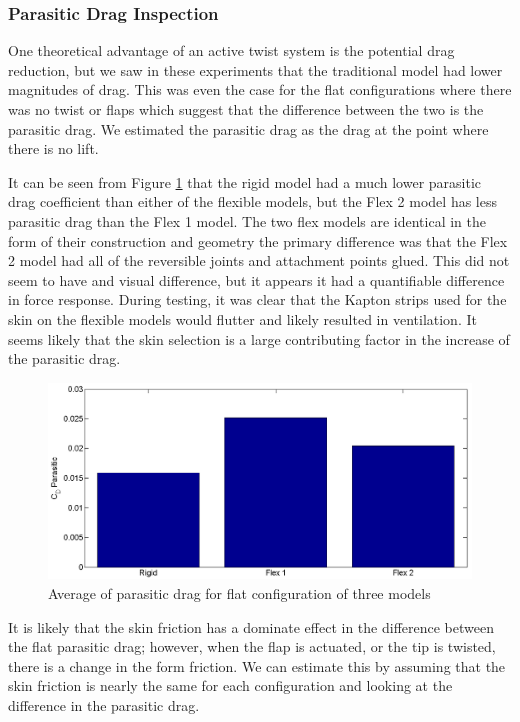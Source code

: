 \documentclass[11pt]{ucthesis}
\begin{document}
\subsubsection{Parasitic Drag Inspection}

One theoretical advantage of an active twist system is the potential drag reduction, but we saw in these experiments that the traditional model had lower magnitudes of drag. This was even the case for the flat configurations where there was no twist or flaps which suggest that the difference between the two is the parasitic drag. We estimated the parasitic drag as the drag at the point where there is no lift.

It can be seen from Figure \ref{fig:parasitic} that the rigid model had a much lower parasitic drag coefficient than either of the flexible models, but the Flex 2 model has less parasitic drag than the Flex 1 model. The two flex models are identical in the form of their construction and geometry the primary difference was that the Flex 2 model had all of the reversible joints and attachment points glued. This did not seem to have and visual difference, but it appears it had a quantifiable difference in force response. During testing, it was clear that the Kapton strips used for the skin on the flexible models would flutter and likely resulted in ventilation. It seems likely that the skin selection is a large contributing factor in the increase of the parasitic drag.

\begin{figure}[thpb]
\centering
\includegraphics[width=.75\linewidth]{Figures/CdPBulkCompare.png}
\caption{Average of parasitic drag for flat configuration of three models}
\label{fig:parasitic}
\end{figure}

It is likely that the skin friction has a dominate effect in the difference between the flat parasitic drag; however, when the flap is actuated, or the tip is twisted, there is a change in the form friction. We can estimate this by assuming that the skin friction is nearly the same for each configuration and looking at the difference in the parasitic drag. 
\end{document}
